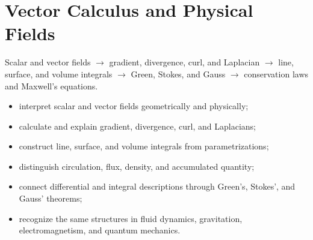 \chapter{Vector Calculus and Physical Fields}
\label{ch:vector-calculus}
\begin{roadmapbox}
Scalar and vector fields $\longrightarrow$ gradient, divergence, curl, and Laplacian $\longrightarrow$ line, surface, and volume integrals $\longrightarrow$ Green, Stokes, and Gauss $\longrightarrow$ conservation laws and Maxwell's equations.
\end{roadmapbox}
\learningobjectives
\begin{itemize}
\item interpret scalar and vector fields geometrically and physically;
\item calculate and explain gradient, divergence, curl, and Laplacians;
\item construct line, surface, and volume integrals from parametrizations;
\item distinguish circulation, flux, density, and accumulated quantity;
\item connect differential and integral descriptions through Green's, Stokes', and Gauss' theorems;
\item recognize the same structures in fluid dynamics, gravitation, electromagnetism, and quantum mechanics.
\end{itemize}
\newpage









